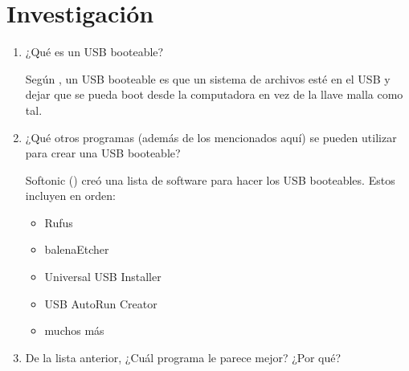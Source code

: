 \documentclass[stu, 12pt, letterpaper, donotrepeattitle, floatsintext, natbib, helv]{apa7}
\begin{document}
\section*{Investigación}
{}

\begin{enumerate}
    \item ¿Qué es un USB booteable? 
    
    Según \cite{WhatIsABootableDrive}, un USB booteable es que un sistema de archivos esté en el USB y dejar que se pueda boot desde la computadora en vez de la llave malla como tal.

    \item ¿Qué otros programas (además de los mencionados aquí) se pueden utilizar para crear una USB booteable? 
    
    Softonic (\cite{SoftwareUSBFlashDrive}) creó una lista de software para hacer los USB booteables. Estos incluyen en orden:
    \begin{itemize}
        \item Rufus
        \item balenaEtcher
        \item Universal USB Installer
        \item USB AutoRun Creator
        \item muchos más
    \end{itemize}
    \item De la lista anterior, ¿Cuál programa le parece mejor? ¿Por qué? 
    

\end{enumerate}
\end{document}
